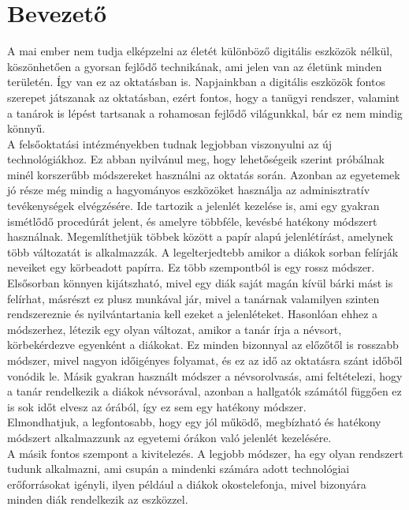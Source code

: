 \documentclass[12pt]{article}
\numberwithin{figure}{section}
\numberwithin{equation}{section}
\begin{document}
\section{Bevezető}

A mai ember nem tudja elképzelni az életét különböző digitális eszközök nélkül, köszönhetően a gyorsan fejlődő technikának, ami jelen van az életünk minden területén. Így van ez az oktatásban is. Napjainkban a digitális eszközök fontos szerepet játszanak az oktatásban, ezért fontos, hogy a tanügyi rendszer, valamint a tanárok is lépést tartsanak a rohamosan fejlődő világunkkal, bár ez nem mindig könnyű.\\
A felsőoktatási intézményekben tudnak legjobban viszonyulni az új technológiákhoz. Ez abban nyilvánul meg, hogy lehetőségeik szerint próbálnak minél korszerűbb módszereket használni az oktatás során. Azonban az egyetemek jó része még mindig a hagyományos eszközöket használja az adminisztratív tevékenységek elvégzésére. Ide tartozik a jelenlét kezelése is, ami egy gyakran ismétlődő procedúrát jelent, és amelyre többféle, kevésbé hatékony módszert használnak. Megemlíthetjük többek között a papír alapú jelenlétírást, amelynek több változatát is alkalmazzák. A legelterjedtebb amikor a diákok sorban felírják neveiket egy körbeadott papírra. Ez több szempontból is egy rossz módszer. Elsősorban könnyen kijátszható, mivel egy diák saját magán kívül bárki mást is felírhat, másrészt ez plusz munkával jár, mivel a tanárnak valamilyen szinten rendszereznie és nyilvántartania kell ezeket a jelenléteket. Hasonlóan ehhez a módszerhez, létezik egy olyan változat, amikor a tanár írja a névsort, körbekérdezve egyenként a diákokat. Ez minden bizonnyal az előzőtől is rosszabb módszer, mivel nagyon időigényes folyamat, és ez az idő az oktatásra szánt időből vonódik le. Másik gyakran használt módszer a névsorolvasás, ami feltételezi, hogy a tanár rendelkezik a diákok névsorával, azonban a hallgatók számától függően ez is sok időt elvesz az órából, így ez sem egy hatékony módszer.\\
Elmondhatjuk, a legfontosabb, hogy egy jól működő, megbízható és hatékony módszert alkalmazzunk az egyetemi órákon való jelenlét kezelésére.\\
A másik fontos szempont a kivitelezés. A legjobb módszer, ha egy olyan rendszert tudunk alkalmazni, ami csupán a mindenki számára adott technológiai erőforrásokat igényli, ilyen például a diákok okostelefonja, mivel bizonyára minden diák rendelkezik az eszközzel.\\
\end{document}
